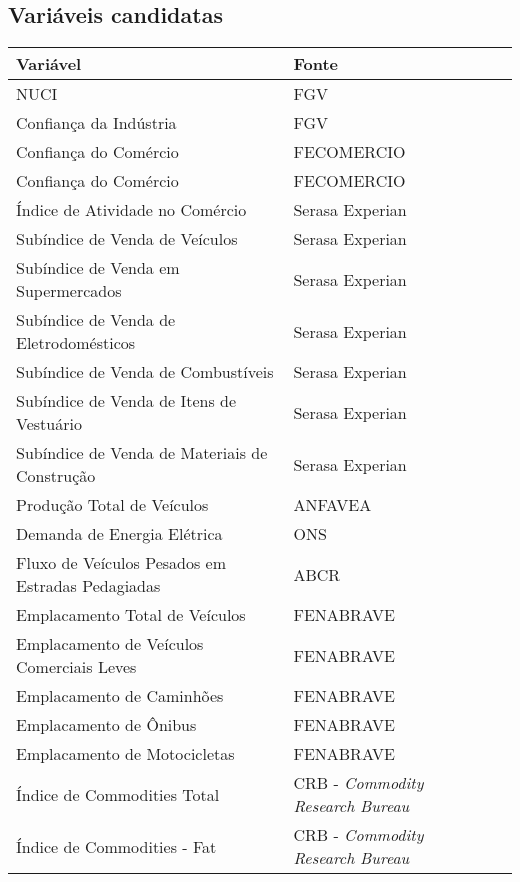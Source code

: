 \documentclass[
	article,			%
	11pt,				%
	oneside,			%
	a4paper,			%
	english,			%
	brazil,				%
	]{abntex2}
\begin{document}
{%

\pagebreak

\begin{appendices}
\chapter{Variáveis candidatas}

	
\begin{table}[H]
		\centering
			\begin{tabular}{lll}
			\hline
			Variável & Fonte \\ \hline
			NUCI & FGV \\
			Confiança da Indústria & FGV \\
			Confiança do Comércio & FECOMERCIO \\
			Confiança do Comércio & FECOMERCIO \\
			Índice de Atividade no Comércio & Serasa Experian \\
			Subíndice de Venda de Veículos & Serasa Experian \\
			Subíndice de Venda em Supermercados & Serasa Experian \\
			Subíndice de Venda de Eletrodomésticos & Serasa Experian \\
			Subíndice de Venda de Combustíveis & Serasa Experian \\
			Subíndice de Venda de Itens de Vestuário & Serasa Experian \\
			Subíndice de Venda de Materiais de Construção & Serasa Experian \\
			Produção Total de Veículos & ANFAVEA \\
			Demanda de Energia Elétrica & ONS \\
			Fluxo de Veículos Pesados em Estradas Pedagiadas & ABCR \\
			Emplacamento Total de Veículos & FENABRAVE \\
			Emplacamento de Veículos Comerciais Leves & FENABRAVE \\
			Emplacamento de Caminhões & FENABRAVE \\
			Emplacamento de Ônibus & FENABRAVE \\
			Emplacamento de Motocicletas & FENABRAVE \\
			Índice de Commodities Total & CRB - \textsl{Commodity Research Bureau} \\
			Índice de Commodities - Fat & CRB - \textsl{Commodity Research Bureau} \\

\end{tabular}
\end{table}
\end{appendices}}
\end{document}
